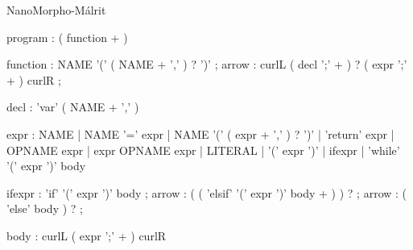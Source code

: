 \documentclass{homework}
\begin{document}
\begin{question}{NanoMorpho-Málrit}
\end{question}
\begin{answer}
  \begin{rail}
    program : ( function + )
  \end{rail}
  \begin{rail}
    function  : NAME '('  ( NAME + ',' ) ? ')' ;
    arrow     : curlL ( decl ';' + ) ? ( expr ';' + ) curlR ;
  \end{rail}
  \begin{rail}
    decl : 'var' ( NAME + ',' )
  \end{rail}
  \begin{rail}
    expr  : NAME
          | NAME '=' expr
          | NAME '('  ( expr + ',' ) ?   ')'
          | 'return' expr
          | OPNAME expr
          | expr OPNAME expr
          | LITERAL
          | '('  expr  ')'
          | ifexpr
          | 'while' '('  expr  ')' body
  \end{rail}
  \begin{rail}
    ifexpr  : 'if' '('  expr  ')' body ;
    arrow   : (  ( 'elsif' '('  expr  ')'  body  + )  ) ? ;
    arrow   : ( 'else' body ) ? ;
  \end{rail}
  \begin{rail}
    body : curlL ( expr ';' + ) curlR
  \end{rail}
\end{answer}
\end{document}

